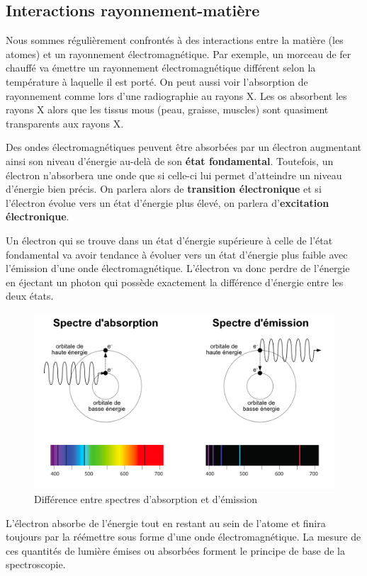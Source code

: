 \documentclass[
  11pt,
  a4paper,
  openany]{book}
\begin{document}
\clearpage

\subsection{Interactions rayonnement-matière}\label{interactions-rayonnement-matiuxe8re-1}

Nous sommes régulièrement confrontés à des interactions entre la matière (les atomes) et un rayonnement électromagnétique. Par exemple, un morceau de fer chauffé va émettre un rayonnement électromagnétique différent selon la température à laquelle il est porté. On peut aussi voir l'absorption de rayonnement comme lors d'une radiographie au rayons X. Les os absorbent les rayons X alors que les tissus mous (peau, graisse, muscles) sont quasiment transparents aux rayons X.

Des ondes électromagnétiques peuvent être absorbées par un électron augmentant ainsi son niveau d'énergie au-delà de son \textbf{état fondamental}. Toutefois, un électron n'absorbera une onde que si celle-ci lui permet d'atteindre un niveau d'énergie bien précis. On parlera alors de \textbf{transition électronique} et si l'électron évolue vers un état d'énergie plus élevé, on parlera d'\textbf{excitation électronique}.

Un électron qui se trouve dans un état d'énergie supérieure à celle de l'état fondamental va avoir tendance à évoluer vers un état d'énergie plus faible avec l'émission d'une onde électromagnétique. L'électron va donc perdre de l'énergie en éjectant un photon qui possède exactement la différence d'énergie entre les deux états.

\begin{figure}

{\centering \includegraphics[width=0.5\linewidth]{images/absorption-emission} 

}

\caption{Différence entre spectres d'absorption et d'émission}\label{fig:absorption-emission}
\end{figure}

L'électron absorbe de l'énergie tout en restant au sein de l'atome et finira
toujours par la réémettre sous forme d'une onde électromagnétique. La mesure de ces quantités de lumière émises ou absorbées forment le principe de base de la spectroscopie.
\end{document}
